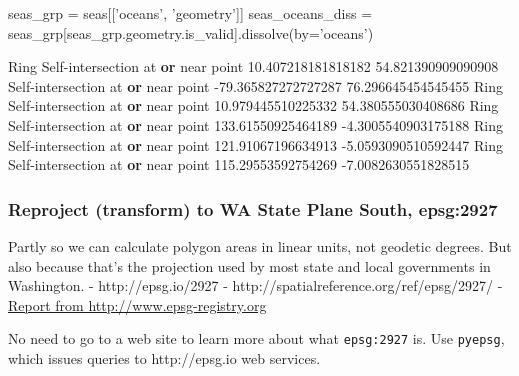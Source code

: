 \documentclass[11pt]{article}
\newenvironment{Shaded}{}{}
\newcommand{\KeywordTok}[1]{\textcolor[rgb]{0.00,0.44,0.13}{\textbf{{#1}}}}
\newcommand{\FloatTok}[1]{\textcolor[rgb]{0.25,0.63,0.44}{{#1}}}
\newcommand{\StringTok}[1]{\textcolor[rgb]{0.25,0.44,0.63}{{#1}}}
\newcommand{\NormalTok}[1]{{#1}}
\newcommand{\OperatorTok}[1]{\textcolor[rgb]{0.40,0.40,0.40}{{#1}}}
\begin{document}
\begin{Shaded}
\begin{Highlighting}[]
\NormalTok{seas_grp }\OperatorTok{=}\NormalTok{ seas[[}\StringTok{'oceans'}\NormalTok{, }\StringTok{'geometry'}\NormalTok{]]}
\NormalTok{seas_oceans_diss }\OperatorTok{=}\NormalTok{ seas_grp[seas_grp.geometry.is_valid].dissolve(by}\OperatorTok{=}\StringTok{'oceans'}\NormalTok{)}

\NormalTok{Ring Self}\OperatorTok{-}\NormalTok{intersection at }\KeywordTok{or}\NormalTok{ near point }\FloatTok{10.407218181818182} \FloatTok{54.821390909090908}
\NormalTok{Self}\OperatorTok{-}\NormalTok{intersection at }\KeywordTok{or}\NormalTok{ near point }\FloatTok{-79.365827272727287} \FloatTok{76.296645454545455}
\NormalTok{Ring Self}\OperatorTok{-}\NormalTok{intersection at }\KeywordTok{or}\NormalTok{ near point }\FloatTok{10.979445510225332} \FloatTok{54.380555030408686}
\NormalTok{Ring Self}\OperatorTok{-}\NormalTok{intersection at }\KeywordTok{or}\NormalTok{ near point }\FloatTok{133.61550925464189} \FloatTok{-4.3005540903175188}
\NormalTok{Ring Self}\OperatorTok{-}\NormalTok{intersection at }\KeywordTok{or}\NormalTok{ near point }\FloatTok{121.91067196634913} \FloatTok{-5.0593090510592447}
\NormalTok{Ring Self}\OperatorTok{-}\NormalTok{intersection at }\KeywordTok{or}\NormalTok{ near point }\FloatTok{115.29553592754269} \FloatTok{-7.0082630551828515}
\end{Highlighting}
\end{Shaded}

    \hypertarget{reproject-transform-to-wa-state-plane-south-epsg2927}{%
\subsubsection{Reproject (transform) to WA State Plane South,
epsg:2927}\label{reproject-transform-to-wa-state-plane-south-epsg2927}}

Partly so we can calculate polygon areas in linear units, not geodetic
degrees. But also because that's the projection used by most state and
local governments in Washington. - http://epsg.io/2927 -
http://spatialreference.org/ref/epsg/2927/ -
\href{http://www.epsg-registry.org/report.htm?type=selection\&entity=urn:ogc:def:crs:EPSG::2927\&reportDetail=short\&style=urn:uuid:report-style:default-with-code\&style_name=OGP\%20Default\%20With\%20Code\&title=EPSG:2927}{Report
from http://www.epsg-registry.org}

    No need to go to a web site to learn more about what \texttt{epsg:2927}
is. Use \texttt{pyepsg}, which issues queries to http://epsg.io web
services.
\end{document}
